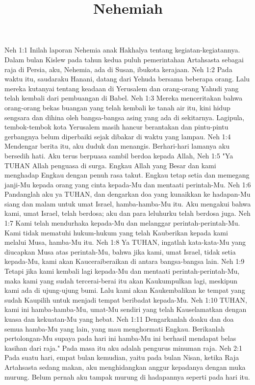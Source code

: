 

\title{Nehemiah}

Neh 1:1  Inilah laporan Nehemia anak Hakhalya tentang kegiatan-kegiatannya. Dalam bulan Kislew pada tahun kedua puluh pemerintahan Artahsasta sebagai raja di Persia, aku, Nehemia, ada di Susan, ibukota kerajaan.
Neh 1:2  Pada waktu itu, saudaraku Hanani, datang dari Yehuda bersama beberapa orang. Lalu mereka kutanyai tentang keadaan di Yerusalem dan orang-orang Yahudi yang telah kembali dari pembuangan di Babel.
Neh 1:3  Mereka menceritakan bahwa orang-orang bekas buangan yang telah kembali ke tanah air itu, kini hidup sengsara dan dihina oleh bangsa-bangsa asing yang ada di sekitarnya. Lagipula, tembok-tembok kota Yerusalem masih hancur berantakan dan pintu-pintu gerbangnya belum diperbaiki sejak dibakar di waktu yang lampau.
Neh 1:4  Mendengar berita itu, aku duduk dan menangis. Berhari-hari lamanya aku bersedih hati. Aku terus berpuasa sambil berdoa kepada Allah,
Neh 1:5  "Ya TUHAN Allah penguasa di surga. Engkau Allah yang Besar dan kami menghadap Engkau dengan penuh rasa takut. Engkau tetap setia dan memegang janji-Mu kepada orang yang cinta kepada-Mu dan mentaati perintah-Mu.
Neh 1:6  Pandanglah aku ya TUHAN, dan dengarkan doa yang kunaikkan ke hadapan-Mu siang dan malam untuk umat Israel, hamba-hamba-Mu itu. Aku mengakui bahwa kami, umat Israel, telah berdosa; aku dan para leluhurku telah berdosa juga.
Neh 1:7  Kami telah mendurhaka kepada-Mu dan melanggar perintah-perintah-Mu. Kami tidak mematuhi hukum-hukum yang telah Kauberikan kepada kami melalui Musa, hamba-Mu itu.
Neh 1:8  Ya TUHAN, ingatlah kata-kata-Mu yang diucapkan Musa atas perintah-Mu, bahwa jika kami, umat Israel, tidak setia kepada-Mu, kami akan Kauceraiberaikan di antara bangsa-bangsa lain.
Neh 1:9  Tetapi jika kami kembali lagi kepada-Mu dan mentaati perintah-perintah-Mu, maka kami yang sudah tercerai-berai itu akan Kaukumpulkan lagi, meskipun kami ada di ujung-ujung bumi. Lalu kami akan Kaukembalikan ke tempat yang sudah Kaupilih untuk menjadi tempat beribadat kepada-Mu.
Neh 1:10  TUHAN, kami ini hamba-hamba-Mu, umat-Mu sendiri yang telah Kauselamatkan dengan kuasa dan kekuatan-Mu yang hebat.
Neh 1:11  Dengarkanlah doaku dan doa semua hamba-Mu yang lain, yang mau menghormati Engkau. Berikanlah pertolongan-Mu supaya pada hari ini hamba-Mu ini berhasil mendapat belas kasihan dari raja." Pada masa itu aku adalah pengurus minuman raja.
Neh 2:1  Pada suatu hari, empat bulan kemudian, yaitu pada bulan Nisan, ketika Raja Artahsasta sedang makan, aku menghidangkan anggur kepadanya dengan muka murung. Belum pernah aku tampak murung di hadapannya seperti pada hari itu.
